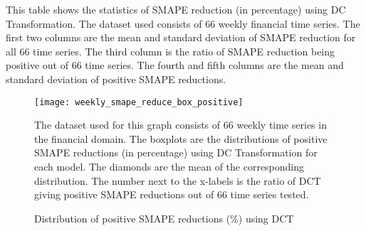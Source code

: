 \begin{table}[H]
    \caption{Statistics of SMAPE reduction (\%) using DCT (weekly finance)}
    {\raggedright \footnotesize This table shows the statistics of SMAPE reduction (in percentage) using DC Transformation. The dataset used consists of $66$ weekly financial time series. The first two columns are the mean and standard deviation of SMAPE reduction for all $66$ time series. The third column is the ratio of SMAPE reduction being positive out of $66$ time series. The fourth and fifth columns are the mean and standard deviation of positive SMAPE reductions. \par}
    \label{tbl: weekly smape reduction}
\end{table}
\begin{figure}[H]
    \centering
    \texttt{[image: weekly\_smape\_reduce\_box\_positive]}
    \caption{Distribution of positive SMAPE reductions (\%) using DCT}
    {\raggedright \footnotesize The dataset used for this graph consists of $66$ weekly time series in the financial domain. The boxplots are the distributions of positive SMAPE reductions (in percentage) using DC Transformation for each model. The diamonds are the mean of the corresponding distribution. The number next to the x-labels is the ratio of DCT giving positive SMAPE reductions out of $66$ time series tested.\par}
    \label{fig: weekly positive smape reduce box}
\end{figure}

